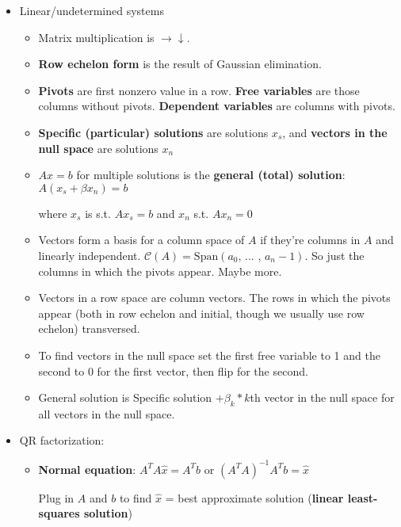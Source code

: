\documentclass[a4paper]{article}
\begin{document}
    \begin{itemize}
        \item Linear/undetermined systems
        \begin{itemize}
            \item Matrix multiplication is \(\rightarrow \downarrow\).
            \item \textbf{Row echelon form} is the result of Gaussian elimination.
            \item \textbf{Pivots} are first nonzero value in a row. \textbf{Free variables} are those columns without pivots. \textbf{Dependent variables} are columns with pivots.
            \item \textbf{Specific (particular) solutions} are solutions \(x_s\), and \textbf{vectors in the null space} are solutions \(x_n\)
            \item \(Ax=b\) for multiple solutions is the \textbf{general (total) solution}: \(A(x_s+\beta x_n)=b\)
            
            where \(x_s\) is s.t. \(Ax_s=b\) and \(x_n\) s.t. \(Ax_n=0\)
            \item Vectors form a basis for a column space of \(A\) if they're columns in \(A\) and linearly independent. \(\mathcal{C}(A)=\text{Span}(a_0\text{, ... , }a_n-1)\). So just the columns in which the pivots appear. Maybe more.
            \item Vectors in a row space are column vectors. The rows in which the pivots appear (both in row echelon and initial, though we usually use row echelon) transversed.
            \item To find vectors in the null space set the first free variable to 1 and the second to 0 for the first vector, then flip for the second.
            \item General solution is Specific solution \( +\beta _k*k\)th vector in the null space for all vectors in the null space.
        \end{itemize}
        
        \item QR factorization:
            \begin{itemize}
                \item \textbf{Normal equation}: \(A^TA\hat{x}=A^Tb\) or \((A^TA)^{-1}A^Tb=\hat{x}\)
                
                Plug in \(A\) and \(b\) to find \(\hat{x}\) = best approximate solution (\textbf{linear least-squares solution}) 
                

\end{itemize}
\end{itemize}
\end{document}
